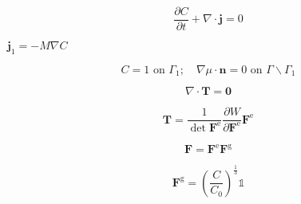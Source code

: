 \documentclass{article}
\begin{document}
\[ \frac{\partial C}{\partial t}+\nabla\cdot\boldsymbol{j}=0 \]
\pagebreak

$\boldsymbol{j}_1=-M\nabla C$
\pagebreak

\[ C=1 \text{ on }\Gamma_1; \quad \nabla \mu\cdot\boldsymbol{n}=0 \text{ on }\Gamma \backslash \Gamma_1 \]
\pagebreak

\[ \nabla\cdot\boldsymbol{T} = \boldsymbol{0} \]
\pagebreak

\[ \boldsymbol{T}= \frac{1}{\det{\boldsymbol{F}^{\text{e}}}}\frac{\partial W}{\partial \boldsymbol{F}^{\text{e}}}\boldsymbol{F}^{\text{e}} \]
\pagebreak

\[ \boldsymbol{F}=\boldsymbol{F}^{\text{e}}\boldsymbol{F}^{\text{g}} \]
\pagebreak

\[ \boldsymbol{F}^{\text{g}}=\left(\frac{C}{C_\text{0}}\right)^{\frac{1}{3}}\mathbb{1} \]
\pagebreak
\end{document}
